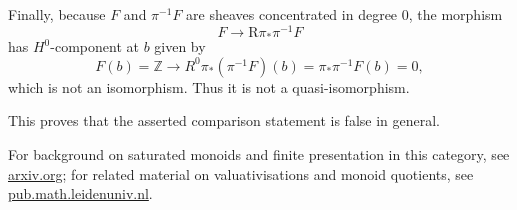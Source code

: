 \documentclass{article}
\theoremstyle{definition}
\newcommand{\bbZ}{\mathbb Z}
\begin{document}
Finally, because $F$ and $\pi^{-1}F$ are sheaves concentrated in degree $0$,
the morphism
\[
F\longrightarrow \mathrm R\pi_*\pi^{-1}F
\]
has $H^0$-component at $b$ given by
\[
F(b)=\bbZ \longrightarrow R^0\pi_*(\pi^{-1}F)(b)=\pi_*\pi^{-1}F(b)=0,
\]
which is not an isomorphism.  Thus it is not a quasi-isomorphism.

\medskip

\noindent
This proves that the asserted comparison statement is false in general.

For background on saturated monoids and finite presentation in this category,
see \href{https://arxiv.org/pdf/2411.13662}{arxiv.org}; for related material on
valuativisations and monoid quotients, see
\href{https://pub.math.leidenuniv.nl/~holmesdst/notes_from_talks/valuativisations_talk.pdf}{pub.math.leidenuniv.nl}.
\end{document}
